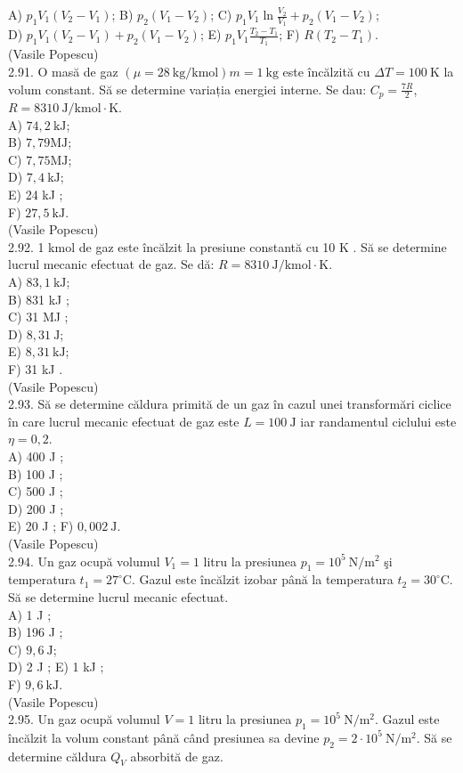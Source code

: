 \documentclass[10pt]{article}
\begin{document}
A) $p_{1} V_{1}\left(V_{2}-V_{1}\right)$; B) $p_{2}\left(V_{1}-V_{2}\right)$; C) $p_{1} V_{1} \ln \frac{V_{2}}{V_{1}}+p_{2}\left(V_{1}-V_{2}\right)$;\\
D) $p_{1} V_{1}\left(V_{2}-V_{1}\right)+p_{2}\left(V_{1}-V_{2}\right)$; E) $p_{1} V_{1} \frac{T_{2}-T_{1}}{T_{1}}$; F) $R\left(T_{2}-T_{1}\right)$.\\
(Vasile Popescu)\\
2.91. O masă de gaz $(\mu=28 \mathrm{~kg} / \mathrm{kmol}) m=1 \mathrm{~kg}$ este încălzită cu $\Delta T=100 \mathrm{~K}$ la volum constant. Să se determine variația energiei interne. Se dau: $C_{p}=\frac{7 R}{2}$, $R=8310 \mathrm{~J} / \mathrm{kmol} \cdot \mathrm{K}$.\\
A) $74,2 \mathrm{~kJ}$;\\
B) $7,79 \mathrm{MJ}$;\\
C) $7,75 \mathrm{MJ}$;\\
D) $7,4 \mathrm{~kJ}$;\\
E) 24 kJ ;\\
F) $27,5 \mathrm{~kJ}$.\\
(Vasile Popescu)\\
2.92. 1 kmol de gaz este încălzit la presiune constantă cu 10 K . Să se determine lucrul mecanic efectuat de gaz. Se dă: $R=8310 \mathrm{~J} / \mathrm{kmol} \cdot \mathrm{K}$.\\
A) $83,1 \mathrm{~kJ}$;\\
B) 831 kJ ;\\
C) 31 MJ ;\\
D) $8,31 \mathrm{~J}$;\\
E) $8,31 \mathrm{~kJ}$;\\
F) 31 kJ .\\
(Vasile Popescu)\\
2.93. Să se determine căldura primită de un gaz în cazul unei transformări ciclice în care lucrul mecanic efectuat de gaz este $L=100 \mathrm{~J}$ iar randamentul ciclului este $\eta=0,2$.\\
A) 400 J ;\\
B) 100 J ;\\
C) 500 J ;\\
D) 200 J ;\\
E) 20 J ; F) $0,002 \mathrm{~J}$.\\
(Vasile Popescu)\\
2.94. Un gaz ocupă volumul $V_{1}=1$ litru la presiunea $p_{1}=10^{5} \mathrm{~N} / \mathrm{m}^{2}$ şi temperatura $t_{1}=27^{\circ} \mathrm{C}$. Gazul este încălzit izobar până la temperatura $t_{2}=30^{\circ} \mathrm{C}$. Să se determine lucrul mecanic efectuat.\\
A) 1 J ;\\
B) 196 J ;\\
C) $9,6 \mathrm{~J}$;\\
D) 2 J ; E) 1 kJ ;\\
F) $9,6 \mathrm{~kJ}$.\\
(Vasile Popescu)\\
2.95. Un gaz ocupă volumul $V=1$ litru la presiunea $p_{1}=10^{5} \mathrm{~N} / \mathrm{m}^{2}$. Gazul este încălzit la volum constant până când presiunea sa devine $p_{2}=2 \cdot 10^{5} \mathrm{~N} / \mathrm{m}^{2}$. Să se determine căldura $Q_{V}$ absorbită de gaz.
\end{document}
